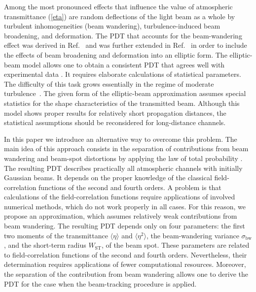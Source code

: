 \documentclass[aps,pra,twocolumn,a4paper,nofootinbib,preprintnumbers] {revtex4-1}
\begin{document}
	Among the most pronounced effects that influence the value of atmospheric transmittance (\ref{eta}) are  random deflections of the light beam as a whole by turbulent inhomogeneities (beam wandering), turbulence-induced beam broadening, and deformation.
	The PDT that accounts for the beam-wandering effect was derived in Ref.~\cite{Vasylyev2012} and was further extended in Ref.~\cite{Vasylyev2016} in order to include the effects of beam broadening and deformation into an elliptic form.
	The elliptic-beam model allows one to obtain a consistent PDT that agrees well with experimental data \cite{Vasylyev2017}.	
	It requires elaborate calculations of statistical parameters.
	The difficulty of this task grows essentially in the regime of moderate turbulence~\cite{Tatarskii1979, Leader, Chumak, Chumak1}.
	The given form of the elliptic-beam approximation assumes special statistics for the shape characteristics of the transmitted beam.
	Although this model shows proper results for relatively short propagation distances, the statistical assumptions should be reconsidered for long-distance channels.
	
	In this paper we introduce an alternative way to overcome this problem.
	The main idea of this approach consists in the separation of contributions from beam wandering and beam-spot distortions by applying the law of total probability \cite{Schervish}.
	The resulting PDT describes practically all atmospheric channels with initially Gaussian beams.
	It depends on the proper knowledge of the classical field-correlation functions of the second and fourth orders.
	A problem is that calculations of the field-correlation functions require applications of involved numerical methods, which do not work properly in all cases.
	For this reason, we propose an approximation, which assumes relatively weak contributions from beam wandering.
	The resulting PDT depends only on four parameters: the first two moments of the transmittance $\langle\eta\rangle$ and $\langle\eta^2\rangle$, the beam-wandering variance  $\sigma_{\mathrm{bw}}$, and the short-term radius  $W_\mathrm{ST}$, of the beam spot.
	These parameters are related to field-correlation functions of the second and fourth orders.
	Nevertheless, their determination requires applications of fewer computational resources.
	Moreover, the separation of the contribution from beam wandering allows one to derive the PDT for the case when the  beam-tracking procedure is applied.
\end{document}
